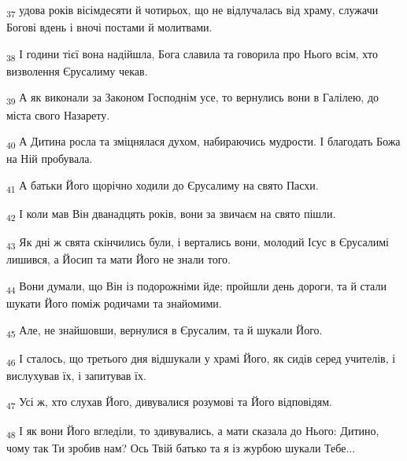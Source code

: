 \begin{tcolorbox}
\textsubscript{37} удова років вісімдесяти й чотирьох, що не відлучалась від храму, служачи Богові вдень і вночі постами й молитвами.
\end{tcolorbox}
\begin{tcolorbox}
\textsubscript{38} І години тієї вона надійшла, Бога славила та говорила про Нього всім, хто визволення Єрусалиму чекав.
\end{tcolorbox}
\begin{tcolorbox}
\textsubscript{39} А як виконали за Законом Господнім усе, то вернулись вони в Галілею, до міста свого Назарету.
\end{tcolorbox}
\begin{tcolorbox}
\textsubscript{40} А Дитина росла та зміцнялася духом, набираючись мудрости. І благодать Божа на Ній пробувала.
\end{tcolorbox}
\begin{tcolorbox}
\textsubscript{41} А батьки Його щорічно ходили до Єрусалиму на свято Пасхи.
\end{tcolorbox}
\begin{tcolorbox}
\textsubscript{42} І коли мав Він дванадцять років, вони за звичаєм на свято пішли.
\end{tcolorbox}
\begin{tcolorbox}
\textsubscript{43} Як дні ж свята скінчились були, і вертались вони, молодий Ісус в Єрусалимі лишився, а Йосип та мати Його не знали того.
\end{tcolorbox}
\begin{tcolorbox}
\textsubscript{44} Вони думали, що Він із подорожніми йде; пройшли день дороги, та й стали шукати Його поміж родичами та знайомими.
\end{tcolorbox}
\begin{tcolorbox}
\textsubscript{45} Але, не знайшовши, вернулися в Єрусалим, та й шукали Його.
\end{tcolorbox}
\begin{tcolorbox}
\textsubscript{46} І сталось, що третього дня відшукали у храмі Його, як сидів серед учителів, і вислухував їх, і запитував їх.
\end{tcolorbox}
\begin{tcolorbox}
\textsubscript{47} Усі ж, хто слухав Його, дивувалися розумові та Його відповідям.
\end{tcolorbox}
\begin{tcolorbox}
\textsubscript{48} І як вони Його вгледіли, то здивувались, а мати сказала до Нього: Дитино, чому так Ти зробив нам? Ось Твій батько та я із журбою шукали Тебе...
\end{tcolorbox}
